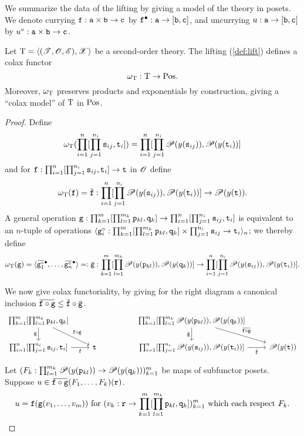 \documentclass[stthol.tex]{subfiles}
\begin{document}
We summarize the data of the lifting by giving a model of the theory in posets. We denote currying $\mathtt{f}:\mathtt{a}\times \mathtt{b}\to \mathtt{c}$ by $\mathtt{f}^\bullet:\mathtt{a}\to [\mathtt{b},\mathtt{c}]$, and uncurrying $u:\mathtt{a}\to [\mathtt{b},\mathtt{c}]$ by $u^\circ:\mathtt{a}\times \mathtt{b}\to \mathtt{c}$.

\begin{theorem}
  \label{sec:thm}
  Let $\mathrm{T} = \langle (\mathscr{T},\mathscr{O},\mathscr{E}),\mathscr{X}\rangle$ be a second-order theory. The lifting (\ref{def:lift}) defines a colax functor
  $$\omega_{\mathrm{T}}:\mathrm{T}\to\mathrm{Pos}.$$
  Moreover, $\omega_{\mathrm{T}}$ preserves products and exponentials by construction, giving a ``colax model'' of $\mathrm{T}$ in $\mathrm{Pos}$.
\end{theorem}
\begin{proof}
  Define
  $$\omega_{\mathrm{T}}(\prod_{i=1}^n [\prod_{j=1}^{n_i}\mathtt{s}_{ij},\mathtt{t}_i]) = \prod_{i=1}^n [\prod_{j=1}^{n_i}\mathscr{P}(y(\mathtt{s}_{ij})), \mathscr{P}(y(\mathtt{t}_i))]$$
  and for $\mathtt{f}: \prod_{i=1}^n [\prod_{j=1}^{n_i}\mathtt{s}_{ij},\mathtt{t}_i] \to \mathtt{t}$ in $\mathscr{O}$ define
  $$\omega_\T(\ttf) = \ob{\ttf}:\prod_{i=1}^n[\prod_{j=1}^{n_i}\pow(y(\tts_{ij})), \pow(y(\ttt_i))]\to \pow(y(\ttt)).$$
  A general operation $\mathtt{g}:\prod_{k=1}^m[\prod_{l=1}^{m_k}\mathtt{p}_{kl},\mathtt{q}_k]\to \prod_{i=1}^n [\prod_{j=1}^{n_i}\mathtt{s}_{ij},\mathtt{t}_i]$ is equivalent to an $n$-tuple of operations $\langle \mathtt{g}_i^\circ: \prod_{k=1}^m [\prod_{l=1}^{m_k}\mathtt{p}_{kl},\mathtt{q}_k]\times \prod_{j=1}^{n_i}\mathtt{s}_{ij}\to \mathtt{t}_i\rangle_n$; we thereby define
  $$\omega_\T(\ttg) = \langle\ob{\ttg_1^\circ}^\bullet,\dots,\ob{\ttg_n^\circ}^\bullet\rangle =:\ob{\ttg}:\prod_{k=1}^m[\prod_{l=1}^{m_k}\pow(y(\p_{kl})),\pow(y(\q_k))]\to \prod_{i=1}^n [\prod_{j=1}^{n_i}\pow(y(\tts_{ij})),\pow(y(\ttt_i))].$$
  
  We now give colax functoriality, by giving for the right diagram a canonical inclusion $\ob{\ttf\circ \ttg} \leq \ob{\ttf}\circ\ob{\ttg}$.
  \[\begin{tikzcd}
  \prod_{k=1}^m [\prod_{l=1}^{m_k}\p_{kl},\q_k] \arrow[d,"\ttg",swap] \arrow[dr,"\ttf\circ\ttg"] & & &
  \prod_{k=1}^m[\prod_{l=1}^{m_k}\pow(y(\p_{kl})),\pow(y(\q_k))] \arrow[d,"\ob{\ttg}",swap] \arrow[dr,"\ob{\ttf\circ\ttg}"]\\
      \prod_{i=1}^n [\prod_{j=1}^{n_i}\tts_{ij},\ttt_i] \arrow[r,"\ttf",swap] & \ttt & &
      \prod_{i=1}^n [\prod_{j=1}^{n_i}\pow(y(\tts_{ij})),\pow(y(\ttt_i))] \arrow[r,"\ob{\ttf}",swap] & \pow(y(\ttt))
    \end{tikzcd}\]

  Let $(F_k:\prod_{l=1}^{m_k}\mathscr{P}(y(\mathtt{p}_{kl}))\to\mathscr{P}(y(\mathtt{q}_k)))_{k=1}^m$ be maps of subfunctor posets. Suppose $u\in \ob{\ttf\circ\ttg}(F_1,\dots,F_k)(\ttrr)$.
  $$u=\mathtt{f}(\mathtt{g}(v_1,\dots,v_m)) \text{ for } (v_k:\mathtt{r}\to \prod_{k=1}^m [\prod_{l=1}^{m_k}\mathtt{p}_{kl},\mathtt{q}_k])_{k=1}^m \text{ which each respect } F_k.$$


\end{proof}
\end{document}
